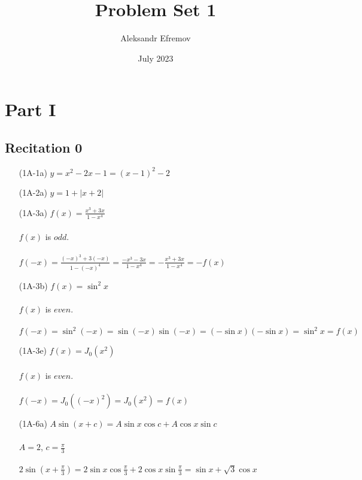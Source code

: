 \documentclass{article}
\title{Problem Set 1}
\author{Aleksandr Efremov}
\date{July 2023}
\begin{document}
\maketitle

\section{Part I}
\subsection{Recitation 0}
\begin{itemize}
\item[(1A-1a)] $y = x^2 - 2x - 1 = (x - 1)^2 - 2$
\begin{figure}[htp!]
    \centering
    
    \label{fig:fig1}
\end{figure}
\newpage
\item[(1A-2a)] $y = 1 + |x + 2|$
\begin{figure}[htp!]
    \centering
    
    \label{fig:fig2}
\end{figure}

\item[(1A-3a)] $f(x) = \frac{x^3+3x}{1-x^4}$ \\ \\
$f(x)$ is $odd$. \\ \\
$f(-x) = \frac{(-x)^3+3(-x)}{1 - (-x)^4} = \frac{-x^3-3x}{1-x^4} = -\frac{x^3+3x}{1-x^4} = -f(x)$

\item[(1A-3b)] $f(x) = \sin^2 x$ \\ \\
$f(x)$ is $even$. \\ \\
$f(-x) = \sin^2(-x) = \sin(-x)\sin(-x) = (-\sin x)(-\sin x) = \sin^2 x = f(x)$

\item[(1A-3e)] $f(x) = J_0(x^2)$ \\ \\
$f(x)$ is $even$. \\ \\
$f(-x) = J_0((-x)^2) = J_0(x^2) = f(x)$

\item[(1A-6a)] $A\sin (x + c) = A\sin x \cos c + A\cos x \sin c$ \\ \\
$A = 2$, $c = \frac{\pi}{3}$ \\ \\
$2\sin(x+\frac{\pi}{3}) = 2\sin x \cos \frac{\pi}{3} + 2\cos x \sin \frac{\pi}{3} = \sin x + \sqrt{3}\cos x$


\end{itemize}
\end{document}
